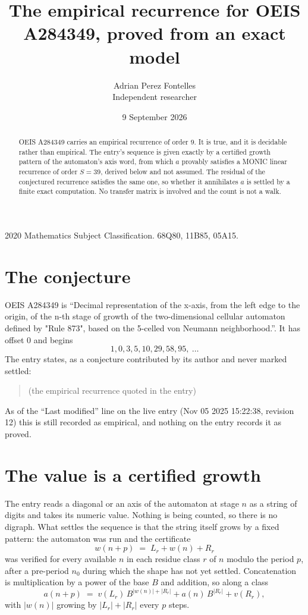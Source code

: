 \documentclass[11pt,a4paper]{article}
\title{The empirical recurrence for OEIS A284349, proved from an exact model}
\author{Adrian Perez Fontelles\\ \small Independent researcher}
\date{9 September 2026}
\theoremstyle{plain}
\theoremstyle{definition}
\begin{document}
\maketitle

\begin{abstract}
OEIS A284349 carries an empirical recurrence of order $9$. It is true, and it is
decidable rather than empirical. The entry's sequence is given exactly by a certified growth pattern of the automaton's axis word, from
which $a$ provably satisfies a MONIC linear recurrence of order $S=39$, derived below and not
assumed. The residual of the conjectured recurrence satisfies the same one, so whether it
annihilates $a$ is settled by a finite exact computation. No transfer matrix is involved and
the count is not a walk.
\end{abstract}

\noindent\small 2020 Mathematics Subject Classification. 68Q80, 11B85, 05A15.\normalsize

\section{The conjecture}

OEIS A284349 is ``Decimal representation of the x-axis, from the left edge to the origin, of the n-th stage of growth of the two-dimensional cellular automaton defined by "Rule 873", based on the 5-celled von Neumann neighborhood.''. It has offset $0$ and begins
\[
1, 0, 3, 5, 10, 29, 58, 95,\ \dots
\]
The entry states, as a conjecture contributed by its author and never marked settled:
\begin{quote}
(the empirical recurrence quoted in the entry)
\end{quote}
As of the ``Last modified'' line on the live entry (Nov 05 2025 15:22:38, revision 12)
this is still recorded as empirical, and nothing on the entry records it as proved.

\section{The value is a certified growth}

The entry reads a diagonal or an axis of the automaton at stage $n$ as a string of digits and takes its
numeric value. Nothing is being counted, so there is no digraph. What settles the sequence is
that the string itself grows by a fixed pattern: the automaton was run and the certificate
\[
w(n+p)\;=\;L_r + w(n) + R_r
\]
was verified for every available $n$ in each residue class $r$ of $n$ modulo the period $p$,
after a pre-period $n_0$ during which the shape has not yet settled. Concatenation is
multiplication by a power of the base $B$ and addition, so along a class
\[
a(n+p)\;=\;v(L_r)\,B^{|w(n)|+|R_r|} + a(n)\,B^{|R_r|} + v(R_r),
\]
with $|w(n)|$ growing by $|L_r|+|R_r|$ every $p$ steps.
\end{document}
